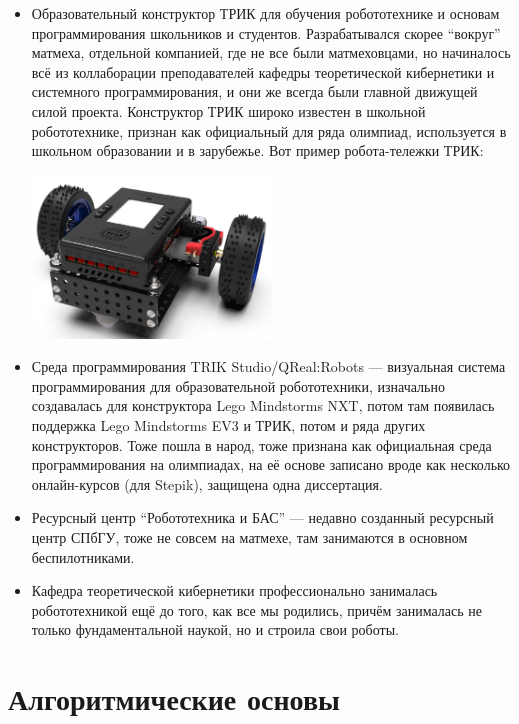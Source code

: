 \documentclass{../../text-style}
\begin{document}
\begin{itemize}
    \item Образовательный конструктор ТРИК для обучения робототехнике и основам программирования школьников и студентов.
    Разрабатывался скорее \enquote{вокруг} матмеха, отдельной компанией, где не все были матмеховцами, но начиналось всё из коллаборации преподавателей кафедры теоретической кибернетики и системного программирования, и они же всегда были главной движущей силой проекта.
    Конструктор ТРИК широко известен в школьной робототехнике, признан как официальный для ряда олимпиад, используется в школьном образовании и в зарубежье.
    Вот пример робота-тележки ТРИК:
        \begin{center}
            \includegraphics[width=0.5\textwidth]{trik.png}
        \end{center}
    \item Среда программирования TRIK Studio/QReal:Robots --- визуальная система программирования для образовательной робототехники, изначально создавалась для конструктора Lego Mindstorms NXT, потом там появилась поддержка Lego Mindstorms EV3 и ТРИК, потом и ряда других конструкторов.
    Тоже пошла в народ, тоже признана как официальная среда программирования на олимпиадах, на её основе записано вроде как несколько онлайн-курсов (для Stepik), защищена одна диссертация.
    \item Ресурсный центр \enquote{Робототехника и БАС} --- недавно созданный ресурсный центр СПбГУ, тоже не совсем на матмехе, там занимаются в основном беспилотниками.
    \item Кафедра теоретической кибернетики профессионально занималась робототехникой ещё до того, как все мы родились, причём занималась не только фундаментальной наукой, но и строила свои роботы.
\end{itemize}

\section{Алгоритмические основы}
\end{document}
